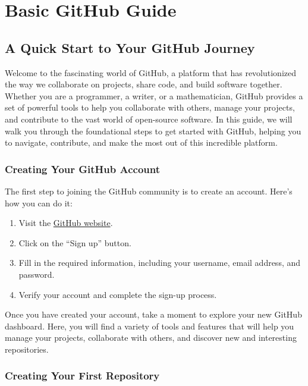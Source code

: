\documentclass[a4paper,12pt]{book}
\begin{document}
\clearpage
{}
\appendix
\renewcommand{\thechapter}{\Roman{chapter}} %

\chapter{Basic GitHub Guide}
\section*{A Quick Start to Your GitHub Journey}

Welcome to the fascinating world of GitHub, a platform that has revolutionized the way we collaborate on projects, share code, and build software together. Whether you are a programmer, a writer, or a mathematician, GitHub provides a set of powerful tools to help you collaborate with others, manage your projects, and contribute to the vast world of open-source software. In this guide, we will walk you through the foundational steps to get started with GitHub, helping you to navigate, contribute, and make the most out of this incredible platform.

\subsection*{Creating Your GitHub Account}

The first step to joining the GitHub community is to create an account. Here’s how you can do it:

\begin{enumerate}
    \item Visit the \href{https://github.com/}{GitHub website}.
    \item Click on the “Sign up” button.
    \item Fill in the required information, including your username, email address, and password.
    \item Verify your account and complete the sign-up process.
\end{enumerate}

Once you have created your account, take a moment to explore your new GitHub dashboard. Here, you will find a variety of tools and features that will help you manage your projects, collaborate with others, and discover new and interesting repositories.

\subsection*{Creating Your First Repository}
\end{document}
